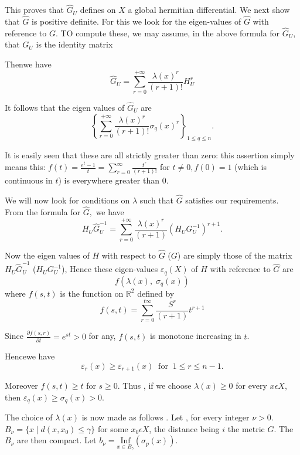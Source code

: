 This proves that $\widehat{G}_U$ defines on $X$ a global hermitian
differential. We next show that $\widehat{G}$ is positive definite. For
this we look for the eigen-values of $\widehat{G}$ with reference to $G$. TO
compute these, we may assume, in the above formula for $\widehat{G}_U$,
that $G_U$ is the identity matrix 

Then\pageoriginale we have
$$ 
\widehat{G}_U= \displaystyle \sum_{r=0}^{+ \infty}
\frac{\lambda(x)^r}{(r+1)!} H_U^r
$$

It follows that the eigen values  of $\widehat{G}_U$ are
$$ 
\left\{\sum\limits_{r=0}^{+ \infty} \frac{\lambda(x)^r}{(r+1)!} 
\sigma_q(x)^r \right\}_{1 \leq q \leq n}. 
$$ 

It is easily seen that  these are all strictly greater than zero: this
assertion simply means  this: $f(t)= \frac{e^t-1}{t}= 
\sum\limits^{\infty}_{r=0} \frac{t^r}{(r+1)!}$ for $t \neq 0, f(0)=1$ (which
is continuous in $t$) is everywhere greater than 0. 

We will now look for conditions on $\lambda$ such  that $\widehat{G}$
satisfies our requirements. From the formula for $\widehat{G},$ we have 
$$
H_U \widehat{G}_U^{-1}= \sum\limits_{r=0}^{+ \infty}
\frac{\lambda(x)^r}{(r+1)} (H_U G_U^{-1})^{r+1}.
$$

Now the eigen values of $H$ with respect to $\widehat{G}$ (\resp $G$) are
simply those of the matrix $H_U \widehat{G}_U^{-1}$ (\resp $H_U G_U^{-1}$),
Hence these eigen-values $\varepsilon_q(X)$ of $H$ with reference to
$\widehat{G}$ are 
$$
f(\lambda(x), \; \sigma_q(x))
$$
where $f(s,t)$ is the function on $\mathbb{R}^2$ defined by
$$
f(s,t)= \sum\limits_{r=0}^{t \infty} \frac{S^r}{(r+1)} t^{r+1} 
$$

Since $\frac{\partial f(s,r)}{\partial t}=e^{st} > 0$ for any,
$f(s,t)$ is monotone increasing in $t$.  

Hence\pageoriginale we have
$$
\varepsilon_r (x) \geqslant \varepsilon_{r+1} (x) ~ \text{ for } ~ 1
\leqslant r \leqslant n-1.  
$$

Moreover $f(s,t) \geqslant t$ for $s \geqslant 0$. Thus , if we choose
$\lambda(x) \geqslant 0$ for  every $x \epsilon X$, then
$\varepsilon_q(x)\geqslant \sigma_q(x)> 0$. 

The choice of $\lambda(x)$ is now made as follows . Let , for every
integer $\nu > 0$. $B_\nu= \bigg\{x \mid d(x,x_0)\leqslant \gamma
\bigg\}$ for some $x_0 \epsilon X$, the distance being $i$ the metric
$G$. The $B_{\nu}$ are then compact. Let $b_{\nu}=\underset{x \in
  B_{\gamma}}{\text{Inf}} (\sigma_p(x))$.

